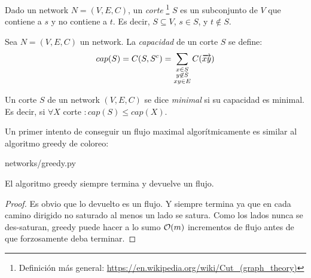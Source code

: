 \begin{definition}
  Dado un network $N = (V, E, C)$, un \emph{corte}
  \footnote{Definición más general: \url{https://en.wikipedia.org/wiki/Cut_(graph_theory)}}
  $S$ es un subconjunto de $V$
  que contiene a $s$ y no contiene a $t$. Es decir, $S \subseteq V$,
  $s \in S$, y $t \not\in S$.
\end{definition}

\begin{definition}
  Sea $N = (V, E, C)$ un network. La \emph{capacidad} de un corte $S$ se define:
  \begin{align}
    cap(S) = C(S, S^c) = \sum_{\substack{x\in S \\ y \not\in S \\ xy \in E}} C(\overrightarrow{xy})
  \end{align}
\end{definition}

\begin{definition}
  Un corte $S$ de un network $(V, E, C)$ se dice \emph{minimal} si su
  capacidad es minimal. Es decir, si
  $\forall X$ corte $ \colon cap(S) \le cap(X)$.
\end{definition}

\begin{definition}
  Un primer intento de conseguir un flujo maximal algorítmicamente es
  similar al algoritmo greedy de coloreo:

  \begin{lstinputlisting}[language=python]{networks/greedy.py}
  \end{lstinputlisting}
\end{definition}

\begin{theorem}
  El algoritmo greedy siempre termina y devuelve un flujo.
\end{theorem}

\begin{proof}
  Es obvio que lo devuelto es un flujo. Y siempre termina ya que en cada camino
  dirigido no saturado al menos un lado se satura. Como los lados nunca se
  des-saturan, greedy puede hacer a lo sumo $\mathcal{O}(m)$ incrementos de flujo antes
  de que forzosamente deba terminar.
\end{proof}
